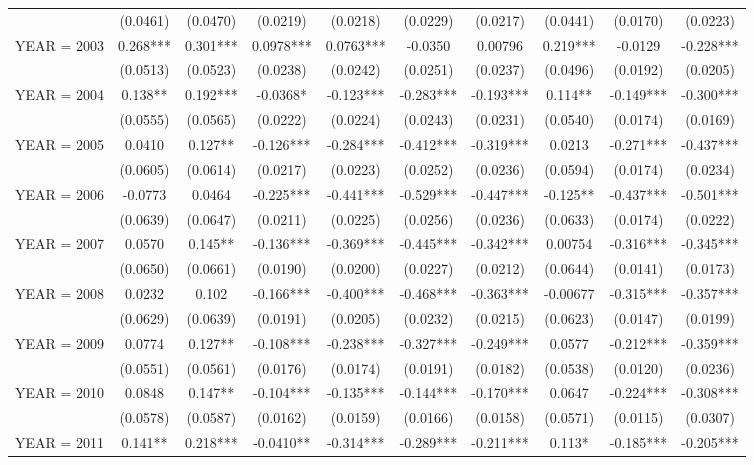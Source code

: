\begin{tabular}{lccccccccc}
 & (0.0461) & (0.0470) & (0.0219) & (0.0218) & (0.0229) & (0.0217) & (0.0441) & (0.0170) & (0.0223) \\
YEAR = 2003 & 0.268*** & 0.301*** & 0.0978*** & 0.0763*** & -0.0350 & 0.00796 & 0.219*** & -0.0129 & -0.228*** \\
 & (0.0513) & (0.0523) & (0.0238) & (0.0242) & (0.0251) & (0.0237) & (0.0496) & (0.0192) & (0.0205) \\
YEAR = 2004 & 0.138** & 0.192*** & -0.0368* & -0.123*** & -0.283*** & -0.193*** & 0.114** & -0.149*** & -0.300*** \\
 & (0.0555) & (0.0565) & (0.0222) & (0.0224) & (0.0243) & (0.0231) & (0.0540) & (0.0174) & (0.0169) \\
YEAR = 2005 & 0.0410 & 0.127** & -0.126*** & -0.284*** & -0.412*** & -0.319*** & 0.0213 & -0.271*** & -0.437*** \\
 & (0.0605) & (0.0614) & (0.0217) & (0.0223) & (0.0252) & (0.0236) & (0.0594) & (0.0174) & (0.0234) \\
YEAR = 2006 & -0.0773 & 0.0464 & -0.225*** & -0.441*** & -0.529*** & -0.447*** & -0.125** & -0.437*** & -0.501*** \\
 & (0.0639) & (0.0647) & (0.0211) & (0.0225) & (0.0256) & (0.0236) & (0.0633) & (0.0174) & (0.0222) \\
YEAR = 2007 & 0.0570 & 0.145** & -0.136*** & -0.369*** & -0.445*** & -0.342*** & 0.00754 & -0.316*** & -0.345*** \\
 & (0.0650) & (0.0661) & (0.0190) & (0.0200) & (0.0227) & (0.0212) & (0.0644) & (0.0141) & (0.0173) \\
YEAR = 2008 & 0.0232 & 0.102 & -0.166*** & -0.400*** & -0.468*** & -0.363*** & -0.00677 & -0.315*** & -0.357*** \\
 & (0.0629) & (0.0639) & (0.0191) & (0.0205) & (0.0232) & (0.0215) & (0.0623) & (0.0147) & (0.0199) \\
YEAR = 2009 & 0.0774 & 0.127** & -0.108*** & -0.238*** & -0.327*** & -0.249*** & 0.0577 & -0.212*** & -0.359*** \\
 & (0.0551) & (0.0561) & (0.0176) & (0.0174) & (0.0191) & (0.0182) & (0.0538) & (0.0120) & (0.0236) \\
YEAR = 2010 & 0.0848 & 0.147** & -0.104*** & -0.135*** & -0.144*** & -0.170*** & 0.0647 & -0.224*** & -0.308*** \\
 & (0.0578) & (0.0587) & (0.0162) & (0.0159) & (0.0166) & (0.0158) & (0.0571) & (0.0115) & (0.0307) \\
YEAR = 2011 & 0.141** & 0.218*** & -0.0410** & -0.314*** & -0.289*** & -0.211*** & 0.113* & -0.185*** & -0.205*** \\

\end{tabular}
